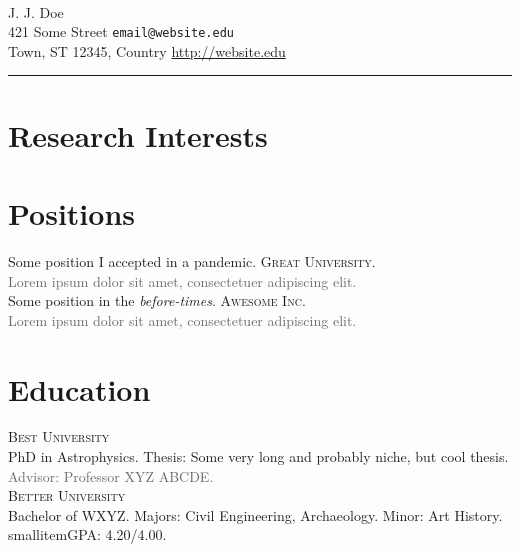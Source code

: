 \documentclass[12pt]{article}
\newcommand{\smallitem}[1]{\small\textcolor{dimgray}{#1}}
\begin{document}
\begin{fullpagesection}
    \begin{flushleft}
        \hfill{\updateinfo} \\
        
        {\huge J. J. Doe} \\[5pt]
        
        421 Some Street \hfill \texttt{email@website.edu} \\
        
        Town, ST 12345, Country \hfill \url{http://website.edu}
    \end{flushleft}
    \centering\rule{7.4in}{1pt}\par
\end{fullpagesection}

\section{Research Interests}
\lipsum[75]

\section{Positions}
 Some position I accepted in a pandemic. \textsc{Great University}.\\
\smallitem{Lorem ipsum dolor sit amet, consectetuer adipiscing elit.}\\

 Some position in the \textit{before-times}. \textsc{Awesome Inc.}\\
\smallitem{Lorem ipsum dolor sit amet, consectetuer adipiscing elit.}

\section{Education}
\textsc{Best University}\\ 
PhD in Astrophysics. Thesis: Some very long and probably niche, but cool thesis.\\
\smallitem{Advisor: Professor XYZ ABCDE.}\\

\textsc{Better University}\\
Bachelor of WXYZ. Majors: Civil Engineering, Archaeology. Minor: Art History.\\
smallitem{GPA: 4.20/4.00.}
\end{document}
